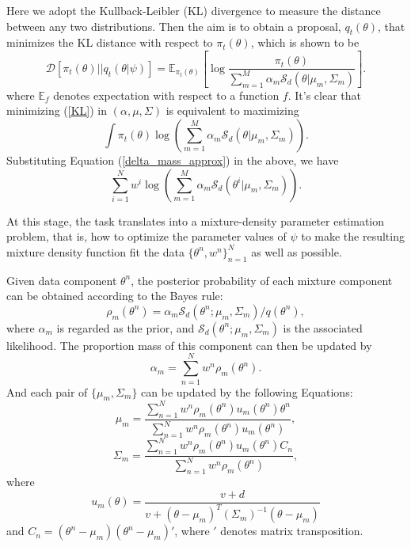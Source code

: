 \documentclass[aoas]{imsart}
\begin{document}
Here we adopt the Kullback-Leibler (KL) divergence to measure the
distance between any two distributions. Then the aim is to obtain a
proposal, $q_t(\theta)$, that minimizes the KL distance with respect
to $\pi_t(\theta)$, which is shown to be
\begin{equation}\label{KL}
\mathcal{D}[\pi_t(\theta)||q_t(\theta|\psi)]=\mathbb{E}_{\pi_t(\theta)}\left[\log\frac{\pi_t(\theta)}{\sum\limits_{m=1}^M
\alpha_m\mathcal{S}_d(\theta|\mu_m,\Sigma_m)}\right].
\end{equation}
where $\mathbb{E}_f$ denotes expectation with respect to a function
$f$. It's clear that minimizing (\ref{KL}) in $(\alpha,\mu,\Sigma)$
is equivalent to maximizing
\begin{equation}\label{MLE}
\int\pi_t(\theta)\log\left(\sum\limits_{m=1}^M
\alpha_m\mathcal{S}_d(\theta|\mu_m,\Sigma_m)\right).
\end{equation}
Substituting Equation (\ref{delta_mass_approx}) in the above, we
have
\begin{equation}\label{Max_log_lik}
\sum_{i=1}^N w^i\log\left(\sum\limits_{m=1}^M
\alpha_m\mathcal{S}_d(\theta^i|\mu_m,\Sigma_m)\right).
\end{equation}

At this stage, the task translates into a mixture-density parameter
estimation problem, that is, how to optimize the parameter values of
$\psi$ to make the resulting mixture density function fit the data
$\{\theta^n,w^n\}_{n=1}^N$ as well as possible.

Given data component $\theta^n$, the posterior probability of each
mixture component can be obtained according to the Bayes rule:
\begin{equation}\label{posterior_prob_component}
\rho_m(\theta^n)=\alpha_m
\mathcal{S}_d(\theta^n;\mu_m,\Sigma_m)/q(\theta^n),
\end{equation}
where $\alpha_m$ is regarded as the prior, and
$\mathcal{S}_d(\theta^n;\mu_m,\Sigma_m)$ is the associated
likelihood. The proportion mass of this component can then be
updated by
\begin{equation}\label{MLE_alpha}
\alpha_m=\sum\limits_{n=1}^N w^n \rho_m(\theta^n).
\end{equation}
And each pair of $\{\mu_m,\Sigma_m\}$ can be updated by the
following Equations:
\begin{equation}
\mu_m=\frac{\sum\limits_{n=1}^N w^n
\rho_m(\theta^n)u_m(\theta^n)\theta^n}{\sum\limits_{n=1}^N w^n
\rho_m(\theta^n)u_m(\theta^n)},
\end{equation}
\begin{equation}\label{MLE_Sigma}
\Sigma_m=\frac{\sum\limits_{n=1}^N w^n
\rho_m(\theta^n)u_m(\theta^n)C_n }{\sum\limits_{n=1}^N w^n
\rho_m(\theta^n)},
\end{equation}
where
\begin{equation}
u_m(\theta)=\frac{v+d}{v+(\theta-\mu_m)^T(\Sigma_m)^{-1}(\theta-\mu_m)}
\end{equation}
and $C_n=(\theta^n-\mu_m)(\theta^n-\mu_m)'$, where $'$ denotes
matrix transposition.
\end{document}
